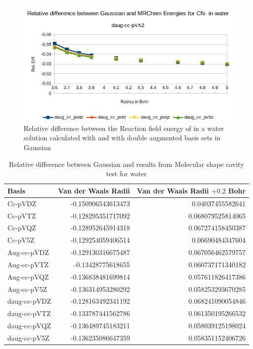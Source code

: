 \documentclass[../master_thesis.tex]{subfiles}
\begin{document}
\begin{figure}[!htb]
  \centering
    \includegraphics[width=\linewidth]{img/cyandaugreldiff.png}
  \caption{Relative difference between the Reaction field energy of  in a water solution calculated with \mrchem
  and with double augmented basis sets in Gaussian}
  \label{fig:cyanreldiffdaug}
\end{figure}


\begin{table}[htbp]
\caption{Relative difference between Gaussian and \mrchem results from Molecular shape cavity  test for water}
\begin{tabular}{l|r|r}
Basis & \multicolumn{1}{l|}{Van der Waals Radii} & \multicolumn{1}{l|}{Van der Waals Radii $+ 0.2$ Bohr} \\ \hline
Cc-pVDZ & -0.150906543613473 & 0.04037455582641 \\
Cc-pVTZ & -0.128295351717092 & 0.068079525814065 \\
Cc-pVQZ & -0.128952645914318 & 0.067274158450387 \\
Cc-pV5Z & -0.129254059406514 & 0.06690484347604 \\
Aug-cc-pVDZ & -0.129130316675487 & 0.067056462579757 \\
Aug-cc-pVTZ & -0.13428775618655 & 0.060737171340182 \\
Aug-cc-pVQZ & -0.136838481699814 & 0.057611826417386 \\
Aug-cc-pV5Z & -0.136314953280292 & 0.058253293670285 \\
daug-cc-pVDZ & -0.128163492341192 & 0.068241090054846 \\
daug-cc-pVTZ & -0.133787441562786 & 0.061350195266532 \\
daug-cc-pVQZ & -0.136489745183211 & 0.058039125198024 \\
daug-cc-pV5Z & -0.136235086647359 & 0.058351152406726 \\
\end{tabular}
\label{tab:watabcreldiff}
\end{table}
\end{document}
